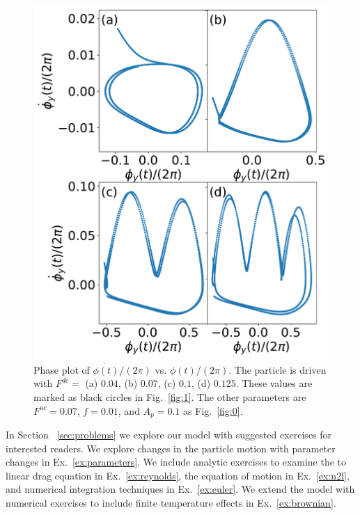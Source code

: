 \documentclass[twocolumn,preprintnumbers,amsmath,amssymb,aps,prx]{revtex4}
\begin{document}
    \begin{figure} %
      \centering
      \includegraphics[width=\columnwidth]{phase.pdf}
      \caption{
        Phase plot of $\dot{\phi(t)}/(2\pi)$ vs. $\phi(t)/(2\pi)$.
        The particle is driven with $F^{dc} = $ (a) $0.04$, (b) $0.07$, (c) $0.1$, (d) $0.125$.  These values are marked as black circles
        in Fig.~\ref{fig:1}. %
      The other parameters
      are $F^{ac} = 0.07$, $f=0.01$, and $A_p = 0.1$
      as Fig.~\ref{fig:0}.}
      \label{fig:phase}
    \end{figure}

In Section ~\ref{sec:problems}
we explore our model
with suggested exercises for interested readers.
We explore changes in the particle motion
with parameter changes in Ex.~\ref{ex:parameters}.
We include analytic exercises to examine the 
to linear drag equation in Ex.~\ref{ex:reynolds}, 
the equation of motion in Ex.~\ref{ex:n2l},
and 
numerical integration techniques in Ex.~\ref{ex:euler}.
We extend the model with
numerical exercises %
to include finite temperature effects
in Ex.~\ref{ex:brownian}.
\end{document}
